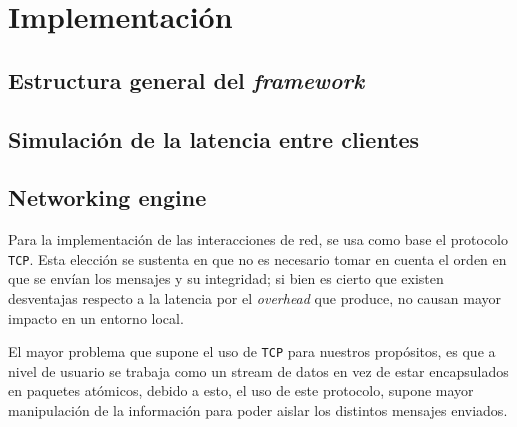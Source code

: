 \section{Implementación}


\subsection{Estructura general del \emph{framework}}

%

\subsection{Simulación de la latencia entre clientes}







\subsection{Networking engine}
Para la implementación de las interacciones de red, se usa como base el protocolo \texttt{TCP}. Esta elección se sustenta en que no es necesario tomar en cuenta el orden en que se envían los mensajes y su integridad; si bien es cierto que existen desventajas respecto a la latencia por el \emph{overhead} que produce, no causan mayor impacto en un entorno local.

El mayor problema que supone el uso de \texttt{TCP} para nuestros propósitos, es que a nivel de usuario se trabaja como un stream de datos en vez de estar encapsulados en paquetes atómicos, debido a esto, el uso de este protocolo, supone mayor manipulación de la información para poder aislar los distintos mensajes enviados.

